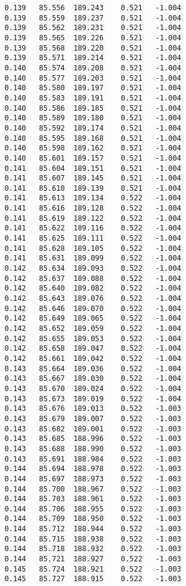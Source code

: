 \begin{verbatim}
   0.139   85.556  189.243    0.521   -1.004
   0.139   85.559  189.237    0.521   -1.004
   0.139   85.562  189.231    0.521   -1.004
   0.139   85.565  189.226    0.521   -1.004
   0.139   85.568  189.220    0.521   -1.004
   0.139   85.571  189.214    0.521   -1.004
   0.140   85.574  189.208    0.521   -1.004
   0.140   85.577  189.203    0.521   -1.004
   0.140   85.580  189.197    0.521   -1.004
   0.140   85.583  189.191    0.521   -1.004
   0.140   85.586  189.185    0.521   -1.004
   0.140   85.589  189.180    0.521   -1.004
   0.140   85.592  189.174    0.521   -1.004
   0.140   85.595  189.168    0.521   -1.004
   0.140   85.598  189.162    0.521   -1.004
   0.140   85.601  189.157    0.521   -1.004
   0.141   85.604  189.151    0.521   -1.004
   0.141   85.607  189.145    0.521   -1.004
   0.141   85.610  189.139    0.521   -1.004
   0.141   85.613  189.134    0.522   -1.004
   0.141   85.616  189.128    0.522   -1.004
   0.141   85.619  189.122    0.522   -1.004
   0.141   85.622  189.116    0.522   -1.004
   0.141   85.625  189.111    0.522   -1.004
   0.141   85.628  189.105    0.522   -1.004
   0.141   85.631  189.099    0.522   -1.004
   0.142   85.634  189.093    0.522   -1.004
   0.142   85.637  189.088    0.522   -1.004
   0.142   85.640  189.082    0.522   -1.004
   0.142   85.643  189.076    0.522   -1.004
   0.142   85.646  189.070    0.522   -1.004
   0.142   85.649  189.065    0.522   -1.004
   0.142   85.652  189.059    0.522   -1.004
   0.142   85.655  189.053    0.522   -1.004
   0.142   85.658  189.047    0.522   -1.004
   0.142   85.661  189.042    0.522   -1.004
   0.143   85.664  189.036    0.522   -1.004
   0.143   85.667  189.030    0.522   -1.004
   0.143   85.670  189.024    0.522   -1.004
   0.143   85.673  189.019    0.522   -1.004
   0.143   85.676  189.013    0.522   -1.003
   0.143   85.679  189.007    0.522   -1.003
   0.143   85.682  189.001    0.522   -1.003
   0.143   85.685  188.996    0.522   -1.003
   0.143   85.688  188.990    0.522   -1.003
   0.143   85.691  188.984    0.522   -1.003
   0.144   85.694  188.978    0.522   -1.003
   0.144   85.697  188.973    0.522   -1.003
   0.144   85.700  188.967    0.522   -1.003
   0.144   85.703  188.961    0.522   -1.003
   0.144   85.706  188.955    0.522   -1.003
   0.144   85.709  188.950    0.522   -1.003
   0.144   85.712  188.944    0.522   -1.003
   0.144   85.715  188.938    0.522   -1.003
   0.144   85.718  188.932    0.522   -1.003
   0.144   85.721  188.927    0.522   -1.003
   0.145   85.724  188.921    0.522   -1.003
   0.145   85.727  188.915    0.522   -1.003

\end{verbatim}
